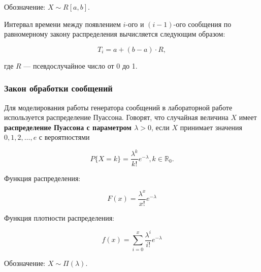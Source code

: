 Обозначение: $X \sim R[a, b]$.

Интервал времени между появлением $i$-ого и $(i - 1)$-ого сообщения по равномерному закону распределения вычисляется следующим образом:

\begin{equation}
	T_{i} = a + (b - a) \cdot R,
\end{equation}

\noindent где $R$ --- псевдослучайное число от 0 до 1.

\subsubsection*{Закон обработки сообщений}

Для моделирования работы генератора сообщений в лабораторной работе используется распределение Пуассона.
Говорят, что случайная величина $X$ имеет \textbf{распределение Пуассона с параметром $\lambda > 0$}, если $X$ принимает значения $0, 1, 2, \dots, e$ с вероятностями 

\begin{equation}
	P\{X=k\} = \frac{\lambda^k}{k!} e^{-\lambda}, k \in \mathbb{R}_0.
\end{equation}

Функция распределения:

\begin{equation}
	F(x) = \frac{\lambda^x}{x!} e^{-\lambda}
\end{equation}

Функция плотности распределения: 

\begin{equation}
	f(x) = \sum\limits_{i = 0}^{x} \frac{\lambda^i}{i!} e^{-\lambda}
\end{equation}

Обозначение: $X \sim \Pi(\lambda)$.